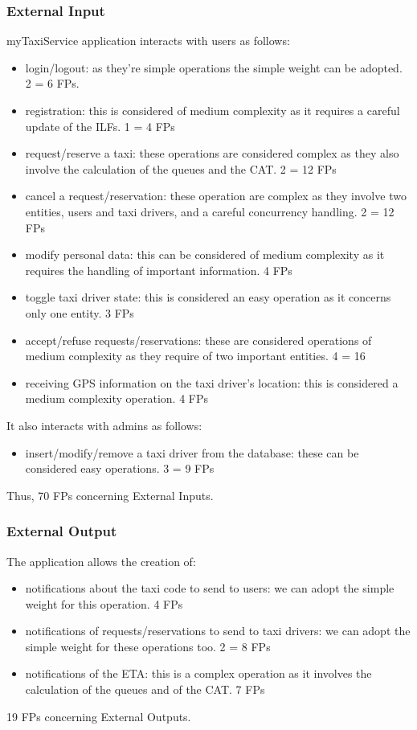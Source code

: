 \documentclass{article}
\begin{document}
\subsubsection{External Input}
myTaxiService application interacts with users
as follows: 
\begin{itemize}
	\item login/logout: as they're simple operations the simple weight can be adopted. 2 = 6 FPs.
	\item registration: this is considered of medium complexity as it requires a careful update of the ILFs. 1 = 4 FPs
	\item request/reserve a taxi: these operations are considered complex as they also involve the calculation of the queues and the CAT. 2 = 12 FPs
	\item cancel a request/reservation: these operation are complex as they involve two entities, users and taxi drivers, and a careful concurrency handling. 2 = 12 FPs
	\item modify personal data: this can be considered of medium complexity as it requires the handling of important information. 4 FPs
	\item toggle taxi driver state: this is considered an easy operation as it concerns only one entity. 3 FPs
	\item accept/refuse requests/reservations: these are considered operations of medium complexity as they require of two important entities. 4 = 16
	\item receiving GPS information on the taxi driver's location: this is considered a medium complexity operation. 4 FPs
\end{itemize}
It also interacts with admins as follows:
\begin{itemize}
	\item insert/modify/remove a taxi driver from the database: these can be considered easy operations. 3 = 9 FPs
\end{itemize}
Thus, 70 FPs concerning External Inputs.

\subsubsection{External Output}
The application allows the creation of:
\begin{itemize}
	\item notifications about the taxi code to send to users: we can adopt the simple weight for this operation. 4 FPs
	\item notifications of requests/reservations to send to taxi drivers: we can adopt the simple weight for these operations too. 2 = 8 FPs
	\item notifications of the ETA: this is a complex operation as it involves the calculation of the queues and of the CAT. 7 FPs
\end{itemize}
19 FPs concerning External Outputs.
\end{document}
